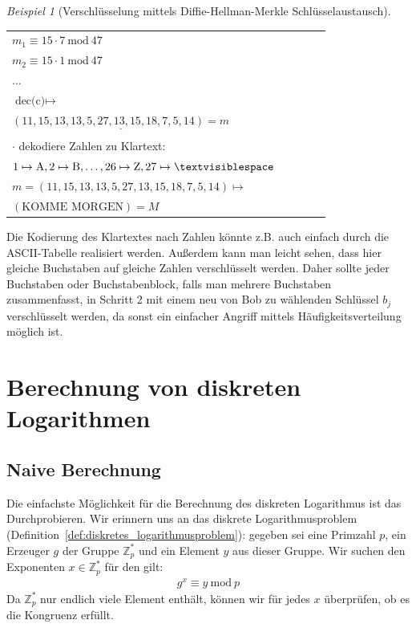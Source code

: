 \documentclass[
  a4paper,
  11pt,
]{scrartcl}
\theoremstyle{plain}
\theoremstyle{definition}
\theoremstyle{remark}
\newtheorem{beispiel}{Beispiel}
\newcommand{\Z}{\mathbb{Z}}
\newcommand{\Mod}[1]{\ \mathrm{mod}\ #1}
\begin{document}
\begin{beispiel}[Verschlüsselung mittels Diffie-Hellman-Merkle Schlüsselaustausch]
\begin{center}
\begin{tabularx}{\textwidth}{lXcXl}
      $m_1 \equiv 15 \cdot 7 \Mod{47}$ & & & & \\
      $m_2 \equiv 15 \cdot 1 \Mod{47}$ & & & & \\
      $\dots$ & & & & \\
      $\text{dec(c)} \mapsto$ & & & & \\
      $\underline{(11, 15, 13, 13, 5, 27, 13, 15, 18, 7, 5, 14) = m}$ & & & & \\
      & & & & \\
      $\cdot$ dekodiere Zahlen zu Klartext: & & & & \\
      $1 \mapsto \text{A}, 2 \mapsto \text{B}, \ldots, 26 \mapsto \text{Z}, 27 \mapsto \textvisiblespace$ & & & & \\
      $m = (11, 15, 13, 13, 5, 27, 13, 15, 18, 7, 5, 14) \mapsto$ & & & & \\
      $(\text{KOMME MORGEN}) = M$ & & & & \\\midrule
    \end{tabularx}
  \end{center}
  Die Kodierung des Klartextes nach Zahlen könnte z.B. auch einfach durch die ASCII-Tabelle realisiert werden. Außerdem kann man leicht sehen, dass hier gleiche Buchstaben auf gleiche Zahlen verschlüsselt werden. Daher sollte  jeder Buchstaben oder Buchstabenblock, falls man mehrere Buchstaben zusammenfasst, in Schritt 2 mit einem neu von Bob zu wählenden Schlüssel $b_j$ verschlüsselt werden, da sonst ein einfacher Angriff mittels Häufigkeitsverteilung möglich ist.
\end{beispiel}


\section{Berechnung von diskreten Logarithmen}
\label{sec:berechnung_von_diskreten_logarithmen}

\subsection{Naive Berechnung}
\label{sub:naive_berechnung}

Die einfachste Möglichkeit für die Berechnung des diskreten Logarithmus ist das
Durchprobieren. Wir erinnern uns an das diskrete Logarithmusproblem
(Definition~\ref{def:diskretes_logarithmusproblem}): gegeben sei eine Primzahl
$p$, ein Erzeuger $g$ der Gruppe $\Z_p^*$ und ein Element $y$ aus dieser Gruppe.
Wir suchen den Exponenten $x \in \Z_p^*$ für den gilt:
\begin{align*}
  g^x \equiv y \Mod{p}
\end{align*}
Da $\Z_p^*$ nur endlich viele Element enthält, können wir für jedes $x$
überprüfen, ob es die Kongruenz erfüllt.
\end{document}
